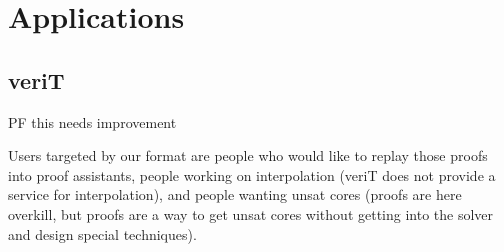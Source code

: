 \documentclass{llncs}
\begin{document}








\section{Applications}
\label{sec:app}

\subsection{veriT}

PF this needs improvement

Users targeted by our format are people who would like to replay those proofs into proof assistants, people working on interpolation (veriT does not provide a service for interpolation), and people wanting unsat cores (proofs are here overkill, but proofs are a way to get unsat cores without getting into the solver and design special techniques).
\end{document}
